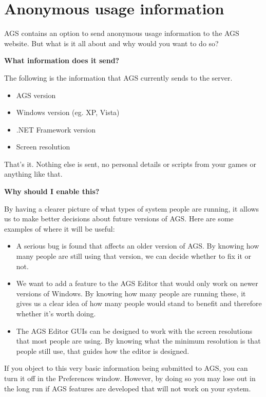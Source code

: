 \chapter{Anonymous usage information}\label{AnonymousUsageInfo}%

AGS contains an option to send anonymous usage information to the AGS website.
But what is it all about and why would you want to do so?

\bf{What information does it send?}

The following is the information that AGS currently sends to the server.

\begin{itemize}\itemsep=0pt
\item AGS version
\item Windows version (eg. XP, Vista)
\item .NET Framework version
\item Screen resolution
\end{itemize}

That's it. Nothing else is sent, no personal details or scripts from your games
or anything like that.

\bf{Why should I enable this?}

By having a clearer picture of what types of system people are running, it
allows us to make better decisions about future versions of AGS. Here are some
examples of where it will be useful:

\begin{itemize}
\item A serious bug is found that affects an older version of AGS. By knowing how
many people are still using that version, we can decide whether to fix it or not.
\item We want to add a feature to the AGS Editor that would only work on newer versions of Windows. By
knowing how many people are running these, it gives us a clear idea of how many
people would stand to benefit and therefore whether it's worth doing.
\item The AGS Editor GUIs can be designed to work with the screen resolutions
that most people are using. By knowing what the minimum resolution is that people
still use, that guides how the editor is designed.
\end{itemize}

If you object to this very basic information being submitted to AGS, you can
turn it off in the Preferences window. However, by doing so you may lose out in
the long run if AGS features are developed that will not work on your system.

